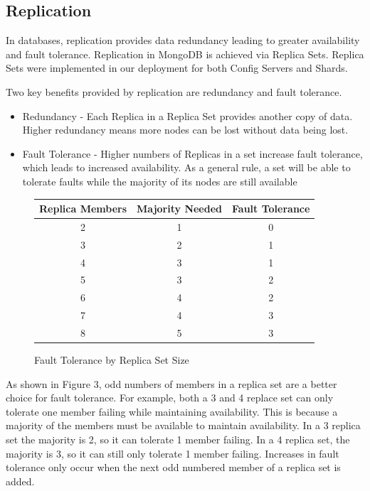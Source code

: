 \documentclass[9pt,twocolumn,twoside]{styles/osajnl}
\begin{document}
\subsection{Replication}

In databases, replication provides data redundancy leading to greater availability and fault tolerance.  Replication in MongoDB is achieved via Replica Sets. \cite{www-replication}  Replica Sets were implemented in our deployment for both Config Servers and Shards.

Two key benefits provided by replication are redundancy and fault tolerance.
\vspace{-\topsep}
\begin{itemize}
\item Redundancy - Each Replica in a Replica Set provides another copy of data.  Higher redundancy means more nodes can be lost without data being lost.
\item Fault Tolerance - Higher numbers of Replicas in a set increase fault tolerance, which leads to increased availability.  As a general rule, a set will be able to tolerate faults while the majority of its nodes are still available
\end{itemize}
\vspace{-\topsep}

\begin{figure}[ht]
\begin{center}
 \begin{tabular}{|c | c | c|} 
 \hline
Replica Members &  Majority Needed & Fault Tolerance \\ [0.5ex] 
 \hline\hline
    
2 &	1 &	0 \\
 \hline
3 &	2 &	1 \\ 
 \hline
4 &	3 &	1 \\ 
 \hline
5 &	3 &	2 \\ 
 \hline
6 &	4 &	2\\ 
 \hline
7 &	4 &	3\\ 
 \hline
8 &	5 &	3\\ [1ex] 
 \hline
\end{tabular}
\end{center}
  \caption{Fault Tolerance by Replica Set Size} \cite{www-mongoRepDep}
\end{figure}


As shown in Figure 3, odd numbers of members in a replica set are a better choice for fault tolerance. For example, both a 3 and 4 replace set can only tolerate one member failing while maintaining availability.  This is because a majority of the members must be available to maintain availability.  In a 3 replica set the majority is 2, so it can tolerate 1 member failing.  In a 4 replica set, the majority is 3, so it can still only tolerate 1 member failing.  Increases in fault tolerance only occur when the next odd numbered member of a replica set is added.  \cite{www-mongoRepDep}
\end{document}
